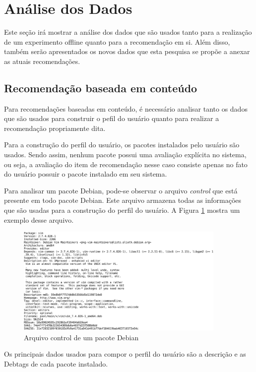\section{Análise dos Dados}

Este seção irá mostrar a análise dos dados que são usados tanto para a
realização de um experimento offline quanto para a recomendação em si. Além
disso, também serão apresentados os novos dados que esta pesquisa se propõe a
anexar as atuais recomendações.

\subsection{Recomendação baseada em conteúdo}

Para recomendações baseadas em conteúdo, é necessário analisar tanto os dados
que são usados para construir o pefil do usuário quanto para realizar a
recomendação propriamente dita.

Para a construção do perfil do usuário, os pacotes instalados pelo usuário são
usados. Sendo assim, nenhum pacote possui uma avaliação explícita no sistema,
ou seja, a avaliação do item de recomendação nesse caso consiste apenas no fato
do usuário possuir o pacote instalado em seu sistema.

Para analisar um pacote Debian, pode-se observar o arquivo \textit{control} que
está presente em todo pacote Debian. Este arquivo
armazena todas as informações que são usadas para a construção do perfil do
usuário. A Figura \ref{fig:control_pacote} mostra um exemplo desse arquivo.

\begin{figure}[h]
  \centering
  \includegraphics[width=0.9\textwidth]{figuras/control_pacote.eps}
  \caption{Arquivo control de um pacote Debian}
  \label{fig:control_pacote}
\end{figure}

Os principais dados usados para compor o perfil do usuário são a
descrição e as Debtags de cada pacote instalado.

